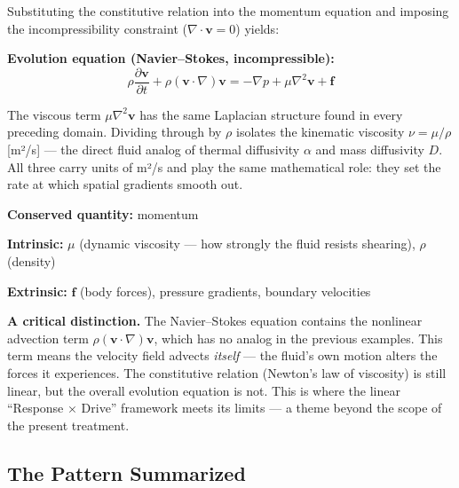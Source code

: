 \documentclass[
  letterpaper,
  DIV=11,
  numbers=noendperiod]{scrartcl}
\begin{document}
Substituting the constitutive relation into the momentum equation and
imposing the incompressibility constraint
(\(\nabla \cdot \mathbf{v} = 0\)) yields:

\textbf{Evolution equation (Navier--Stokes, incompressible):}
\[\rho \frac{\partial \mathbf{v}}{\partial t} + \rho(\mathbf{v} \cdot \nabla)\mathbf{v} = -\nabla p + \mu \nabla^2 \mathbf{v} + \mathbf{f}\]

The viscous term \(\mu\nabla^2\mathbf{v}\) has the same Laplacian
structure found in every preceding domain. Dividing through by \(\rho\)
isolates the kinematic viscosity \(\nu = \mu/\rho\) {[}m²/s{]} --- the
direct fluid analog of thermal diffusivity \(\alpha\) and mass
diffusivity \(D\). All three carry units of m²/s and play the same
mathematical role: they set the rate at which spatial gradients smooth
out.

\textbf{Conserved quantity:} momentum

\textbf{Intrinsic:} \(\mu\) (dynamic viscosity --- how strongly the
fluid resists shearing), \(\rho\) (density)

\textbf{Extrinsic:} \(\mathbf{f}\) (body forces), pressure gradients,
boundary velocities

\begin{tcolorbox}[enhanced jigsaw, title=\textcolor{quarto-callout-important-color}{\faExclamation}\hspace{0.5em}{Important}, breakable, left=2mm, opacitybacktitle=0.6, rightrule=.15mm, opacityback=0, toptitle=1mm, bottomrule=.15mm, arc=.35mm, leftrule=.75mm, colbacktitle=quarto-callout-important-color!10!white, toprule=.15mm, colframe=quarto-callout-important-color-frame, bottomtitle=1mm, titlerule=0mm, colback=white, coltitle=black]

\textbf{A critical distinction.} The Navier--Stokes equation contains
the nonlinear advection term
\(\rho(\mathbf{v} \cdot \nabla)\mathbf{v}\), which has no analog in the
previous examples. This term means the velocity field advects
\emph{itself} --- the fluid's own motion alters the forces it
experiences. The constitutive relation (Newton's law of viscosity) is
still linear, but the overall evolution equation is not. This is where
the linear ``Response × Drive'' framework meets its limits --- a theme
beyond the scope of the present treatment.

\end{tcolorbox}

\subsection{The Pattern Summarized}\label{the-pattern-summarized}
\end{document}
